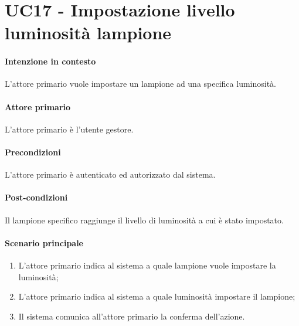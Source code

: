 \section{UC17 - Impostazione livello luminosità lampione}\label{uc:17}
\paragraph{Intenzione in contesto} L'attore primario vuole impostare un lampione ad una specifica luminosità.

\paragraph{Attore primario} L'attore primario è l'utente gestore.

\paragraph{Precondizioni}  L'attore primario è autenticato ed autorizzato dal sistema.

\paragraph{Post-condizioni} Il lampione specifico raggiunge il livello di luminosità a cui è stato impostato.
\paragraph{Scenario principale}
\begin{enumerate}
    \item L'attore primario indica al sistema a quale lampione vuole impostare la luminosità;
    \item L'attore primario indica al sistema a quale luminosità impostare il lampione;
    \item Il sistema comunica all'attore primario la conferma dell'azione.
\end{enumerate}